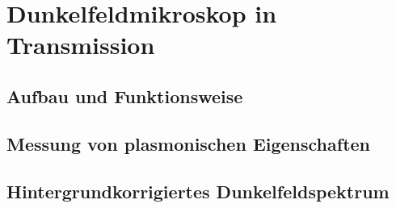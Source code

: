
\section{Dunkelfeldmikroskop in Transmission}

\subsection{Aufbau und Funktionsweise}

\subsection{Messung von plasmonischen Eigenschaften}

\subsection{Hintergrundkorrigiertes Dunkelfeldspektrum}
